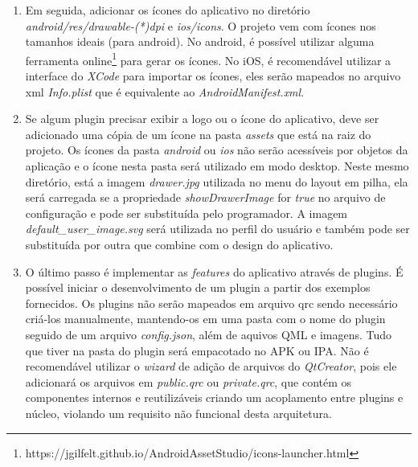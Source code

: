 \begin{enumerate}
	\item Em seguida, adicionar os ícones do aplicativo no diretório \textit{android/res/drawable-(*)dpi} e \textit{ios/icons}. O projeto vem com ícones nos tamanhos ideais (para android). No android, é possível utilizar alguma ferramenta online\footnote{https://jgilfelt.github.io/AndroidAssetStudio/icons-launcher.html} para gerar os ícones. No iOS, é recomendável utilizar a interface do \textit{XCode} para importar os ícones, eles serão mapeados no arquivo xml \textit{Info.plist} que é equivalente ao \textit{AndroidManifest.xml}.

	\item Se algum plugin precisar exibir a logo ou o ícone do aplicativo, deve ser adicionado uma cópia de um ícone na pasta \textit{assets} que está na raiz do projeto. Os ícones da pasta \textit{android} ou \textit{ios} não serão acessíveis por objetos da aplicação e o ícone nesta pasta será utilizado em modo desktop. Neste mesmo diretório, está a imagem \textit{drawer.jpg} utilizada no menu do layout em pilha, ela será carregada se a propriedade \textit{showDrawerImage} for \textit{true} no arquivo de configuração e pode ser substituída pelo programador. A imagem \textit{default\_user\_image.svg} será utilizada no perfil do usuário e também pode ser substituída por outra que combine com o design do aplicativo.

	\item O último passo é implementar as \textit{features} do aplicativo através de plugins. É possível iniciar o desenvolvimento de um plugin a partir dos exemplos fornecidos. Os plugins não serão mapeados em arquivo qrc sendo necessário criá-los manualmente, mantendo-os em uma pasta com o nome do plugin seguido de um arquivo \textit{config.json}, além de aquivos QML e imagens. Tudo que tiver na pasta do plugin será empacotado no APK ou IPA. Não é recomendável utilizar o \textit{wizard} de adição de arquivos do \textit{QtCreator}, pois ele adicionará os arquivos em \textit{public.qrc} ou \textit{private.qrc}, que contém os componentes internos e reutilizáveis criando um acoplamento entre plugins e núcleo, violando um requisito não funcional desta arquitetura.
\end{enumerate}